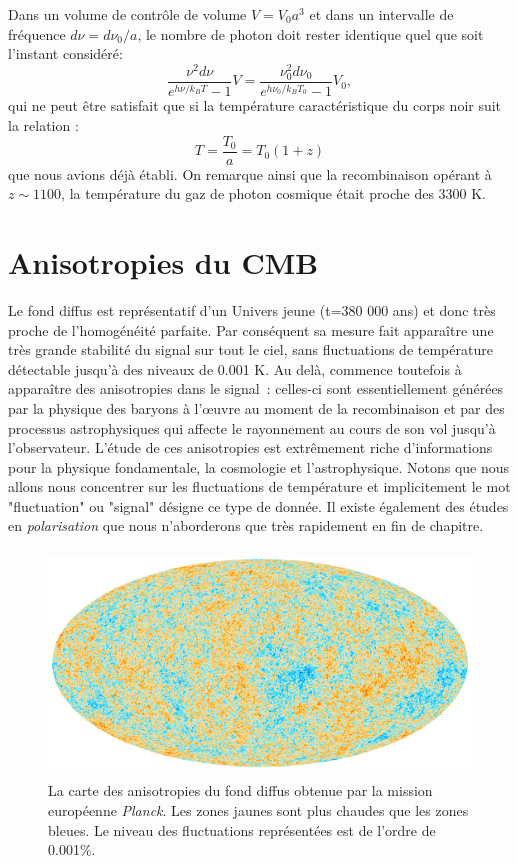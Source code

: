 Dans un volume de contrôle de volume $V=V_0a^3$ et dans un intervalle de fréquence $d\nu=d\nu_0/a$, le nombre de photon doit rester identique quel que soit l'instant considéré:
\begin{equation}
\frac{\nu^2d\nu}{e^{h\nu/k_BT}-1}V=\frac{\nu_0^2d\nu_0}{e^{h\nu_0/k_BT_0}-1}V_0,
\end{equation}
qui ne peut être satisfait que si la température caractéristique du corps noir suit la relation :
\begin{equation}
T=\frac{T_0}{a}=T_0(1+z)
\end{equation}
que nous avions déjà établi. On remarque ainsi que la recombinaison opérant à $z\sim1100$, la température du gaz de photon cosmique était proche des 3300 K.

\section{Anisotropies du CMB}
Le fond diffus est représentatif d'un Univers jeune (t=380 000 ans) et donc très proche de l'homogénéité parfaite. Par conséquent sa mesure fait apparaître une très grande stabilité du signal sur tout le ciel, sans fluctuations de température détectable jusqu'à des niveaux de 0.001 K. Au delà, commence toutefois à apparaître des anisotropies dans le signal~: celles-ci sont essentiellement générées par la physique des baryons à l'œuvre au moment de la recombinaison et par des processus astrophysiques qui affecte le rayonnement au cours de son vol jusqu'à l'observateur. L'étude de ces anisotropies est extrêmement riche d'informations pour la physique fondamentale, la cosmologie et l'astrophysique. Notons que nous allons nous concentrer sur les fluctuations de température et implicitement le mot "fluctuation" ou "signal" désigne ce type de donnée. Il existe également des études en \textit{polarisation} que nous n'aborderons que très rapidement en fin de chapitre.

\begin{figure}[htbp]
	\centering
		\includegraphics[height=6cm]{figs/planck2015.png}
		\caption{La carte des anisotropies du fond diffus obtenue par la mission européenne \textit{Planck}. Les zones jaunes sont plus chaudes que les zones bleues. Le niveau des fluctuations représentées est de l'ordre de 0.001\%.}
	\label{f:planckmap}
\end{figure}

